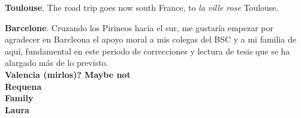 \textbf{Toulouse}. The road trip goes now south France, to \textsl{la ville rose} Toulouse. 

\textbf{Barcelone}. Cruzando los Pirineos hacia el sur, me gustaría empezar por agradecer en Barcleona el apoyo moral a mis colegas del BSC y a mi familia de aquí, fundamental en este periodo de correcciones y lectura de tesis que se ha alargado más de lo previsto. \\ 


\textbf{Valencia (mirlos)? Maybe not} \\


\textbf{Requena} \\


\textbf{Family} \\


\textbf{Laura}


%

